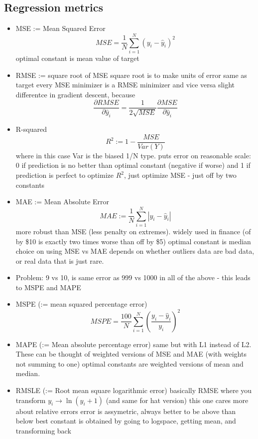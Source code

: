 \documentclass[a4paper]{report}
\begin{document}
\subsection{Regression metrics}
\begin{itemize}
  \item MSE := Mean Squared Error
    \begin{equation}
      MSE = \frac{1}{N}\sum_{i=1}^N(y_i - \hat{y}_i)^2
    \end{equation}
      \subitem optimal constant is mean value of target
    \item RMSE := square root of MSE
      \subitem square root is to make units of error same as target
      \subitem every MSE minimizer is a RMSE minimizer and vice versa
      \subitem slight differentce in gradient descent, because
      $$ \frac{\partial RMSE}{\partial \hat{y}_i} = \frac{1}{2\sqrt{MSE}} \frac{\partial MSE}{\partial \hat{y}_i} $$
    \item R-squared
      \begin{equation}
	R^2 := 1 - \frac{MSE}{Var(Y)}
      \end{equation}
      where in this case Var is the biased 1/N type.
      \subitem puts error on reasonable scale: 0 if prediction is no better than optimal constant (negative if worse) and 1 if prediction is perfect
      \subitem to optimize $R^2$, just optimize MSE - just off by two constants
    \item MAE := Mean Absolute Error
      \begin{equation}
        MAE := \frac{1}{N} \sum_{i=1}^N |y_i - \hat{y}_i|
      \end{equation}
      \subitem more robust than MSE (less penalty on extremes).
      \subitem widely used in finance (of by \$10 is exactly two times worse than off by \$5)
      \subitem optimal constant is median
      \subitem choice on using MSE vs MAE depends on whether outliers data are bad data, or real data that is just rare.
    \item Problem: 9 vs 10, is same error as 999 vs 1000 in all of the above - this leads to MSPE and MAPE
    \item MSPE (:= mean squared percentage error)
      \begin{equation}
	MSPE = \frac{100}{N} \sum_{i=1}^N\left( \frac{y_i - \hat{y}_i}{y_i} \right)^2
      \end{equation}
    \item MAPE (:= Mean absolute percentage error) 
      \subitem same but with L1 instead of L2.
      \subitem These can be thought of weighted versions of MSE and MAE (with weights not summing to one)
      \subitem optimal constants are weighted versions of mean and median.
    \item RMSLE (:= Root mean square logarithmic error)
      \subitem basically RMSE where you transform $y_i \to \ln(y_i + 1)$ (and same for hat version)
      \subitem this one cares more about relative errors
      \subitem error is assymetric, always better to be above than below
      \subitem best constant is obtained by going to logspace, getting mean, and transforming back
\end{itemize}
\end{document}
